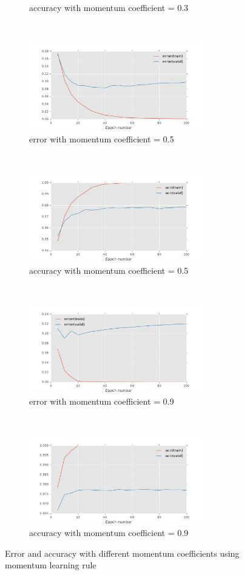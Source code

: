 \documentclass[11pt]{article}
\begin{document}
\begin{figure}[t!]
\begin{subfigure}[t]{0.45\textwidth}
        \caption{accuracy with momentum coefficient = 0.3}
    \end{subfigure}    
    ~
    \begin{subfigure}[t]{0.45\textwidth}
        \centering
        \includegraphics[height=1.5in]{error_with_mom_0_5.pdf}
        \caption{error with momentum coefficient = 0.5}
    \end{subfigure}   
    ~
    \begin{subfigure}[t]{0.45\textwidth}
        \centering
        \includegraphics[height=1.5in]{acc_with_mom_0_5.pdf}
        \caption{accuracy with momentum coefficient = 0.5}
    \end{subfigure}      ~
    \begin{subfigure}[t]{0.45\textwidth}
        \centering
        \includegraphics[height=1.5in]{error_with_mom_0_9.pdf}
        \caption{error with momentum coefficient = 0.9}
    \end{subfigure}   
    ~
    \begin{subfigure}[t]{0.45\textwidth}
        \centering
        \includegraphics[height=1.5in]{acc_with_mom_0_9.pdf}
        \caption{accuracy with momentum coefficient = 0.9}
    \end{subfigure}      
    \caption{Error and accuracy with different momentum coefficients using momentum learning rule}    
    \label{fig:const_mom}
\end{figure}
\end{document}
